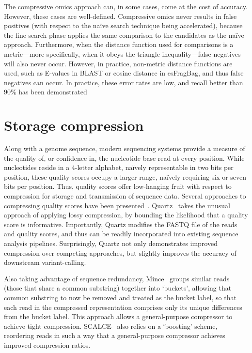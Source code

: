 \documentclass{acm_proc_article-sp}
\begin{document}
The compressive omics approach can, in some cases, come at the cost of accuracy.
However, these cases are well-defined.
Compressive omics never results in false positives (with respect to the na\"ive 
search technique being accelerated), because the fine search phase applies the
same comparison to the candidates as the na\"ive approach.
Furthermore, when the distance function used for comparisons is a metric---more specifically, when it obeys the triangle inequality---false negatives will also
never occur.
However, in practice, non-metric distance functions are used, such as E-values
in BLAST or cosine distance in esFragBag, and thus false negatives can occur.
In practice, these error rates are low, and recall better than 90\% has been
demonstrated~\cite{loh2012compressive,daniels2013compressive,yu2015entropy}


\section{Storage compression}

Along with a genome sequence, modern sequencing systems provide a measure of
the quality of, or confidence in, the nucleotide base read at every position.
While nucleotides reside in a 4-letter alphabet, na\"ively representable in two 
bits per position, these quality scores occupy a larger range, na\"ively
requiring six or seven bits per position.
Thus, quality scores offer low-hanging fruit with respect to compression for 
storage and transmission of sequence data.
Several approaches to compressing quality scores have been 
presented~\cite{janin2013adaptive,bonfield2013compression,ochoa2013qualcomp,yu2015quality}.
Quartz~\cite{yu2015quality} takes the unusual approach of applying lossy 
compression, by bounding the likelihood that a quality score is informative.
Importantly, Quartz modifies the FASTQ file of the reads and quality scores, and thus can be
readily incorporated into existing sequence analysis pipelines.
Surprisingly, Quartz not only demonstrates improved compression over competing
approaches, but slightly improves the accuracy of downstream variant-calling.

Also taking advantage of sequence redundancy, Mince~\cite{patro2015data} groups 
similar reads (those that share a common 
substring) together into `buckets', allowing that common substring to now be 
removed and treated as the bucket label, so that each read in the compressed 
representation comprises only its unique differences from the bucket label.
This approach allows a general-purpose compressor to achieve tight compression.
SCALCE~\cite{berger2013computational} also relies on a `boosting' scheme, 
reordering
reads in such a way that a general-purpose compressor achieves improved
compression ratios.
\end{document}
